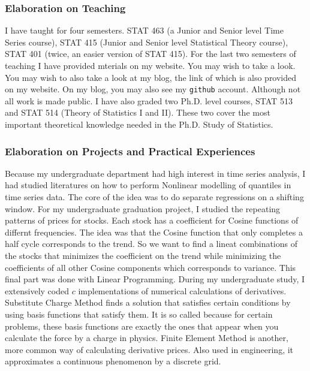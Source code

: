 \documentclass[utf8,letterpaper,oneside]{article}
\begin{document}
\subsubsection*{Elaboration on Teaching}
I have taught for four semesters. STAT 463 (a Junior and Senior level Time Series course), STAT 415 (Junior and Senior level Statistical Theory course), STAT 401 (twice, an easier version of STAT 415). For the last two semesters of teaching I have provided mterials on my website. You may wish to take a look. You may wish to also take a look at my blog, the link of which is also provided on my website. On my blog, you may also see my \texttt{github} account. Although not all work is made public. I have also graded two Ph.D. level courses, STAT 513 and STAT 514 (Theory of Statistics I and II). These two cover the most important theoretical knowledge needed in the Ph.D. Study of Statistics.
\subsubsection*{Elaboration on Projects and Practical Experiences}
Because my undergraduate department had high interest in time series analysis, I had studied literatures on how to perform Nonlinear modelling of quantiles in time series data. The core of the idea was to do separate regressions on a shifting window. For my undergraduate graduation project, I studied the repeating patterns of prices for stocks. Each stock has a coefficient for Cosine functions of differnt frequencies. The idea was that the Cosine function that only completes a half cycle corresponds to the trend. So we want to find a lineat combinations of the stocks that minimizes the coefficient on the trend while minimizing the coefficients of all other Cosine components which corresponds to variance. This final part was done with Linear Programming. During my undergraduate study, I extensively coded $c$ implementations of numerical calculations of derivatives. Substitute Charge Method finds a solution that satisfies certain conditions by using basis functions that satisfy them. It is so called because for certain problems, these basis functions are exactly the ones that appear when you calculate the force by a charge in physics. Finite Element Method is another, more common way of calculating derivative prices. Also used in engineering, it approximates a continuous phenomenon by a discrete grid. 
\end{document}
